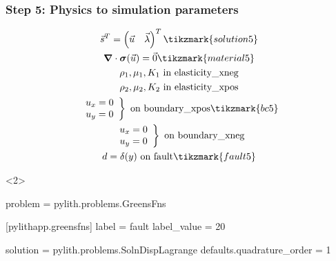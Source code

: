 \documentclass[aspectratio=169]{beamer}
\begin{document}
\begin{frame}[t,fragile]
  \frametitle{Step 5: Physics to simulation parameters}
  \summary{}

  \begin{minipage}[t]{0.35\textwidth}
    {\scriptsize
    \begin{gather*}
    \vec{s}^T = \left( \vec{u} \quad \vec{\lambda} \right)^T \tikzmark{solution5}\\
    \tensor{\nabla} \cdot \tensor{\sigma}(\vec{u}) = \vec{0} \tikzmark{material5} \\
    \rho_1, \mu_1, K_1 \text{ in elasticity\_xneg} \\ 
    \rho_2, \mu_2, K_2 \text{ in elasticity\_xpos} \\ 
    \left. \begin{array}{c} u_x = 0 \\ u_y = 0 \end{array}\right\} \text{ on boundary\_xpos} \tikzmark{bc5}\\
    \left. \begin{array}{c} u_x = 0 \\ u_y = 0 \end{array}\right\} \text{ on boundary\_xneg} \\
    d = \delta(y) \text{ on fault} \tikzmark{fault5}
    \end{gather*}}
  \end{minipage}
  \hfill
  \begin{minipage}[t]{0.60\textwidth}
    \begin{onlyenv}<2>
      \begin{cfgcode}
        [pylithapp]
        problem = pylith.problems.GreensFns

        [pylithapp.greensfns]
        label = fault
        label_value = 20

        solution = pylith.problems.SolnDispLagrange
        defaults.quadrature_order = 1
        

\end{cfgcode}
\end{onlyenv}
\end{minipage}
\end{frame}
\end{document}
